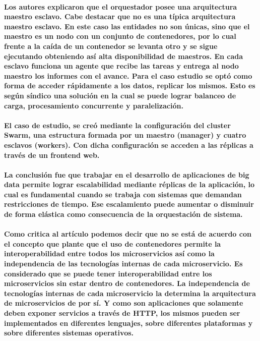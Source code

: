 \paragraph{
    Los autores explicaron que el orquestador posee una arquitectura maestro esclavo. Cabe destacar que no es una típica arquitectura maestro esclavo. En este caso las entidades no son únicas, sino que el maestro es un nodo con un conjunto de contenedores, por lo cual frente a la caída de un contenedor se levanta otro y se sigue ejecutando obteniendo así alta disponibilidad de maestros.
    En cada esclavo funciona un agente que recibe las tareas y entrega al nodo maestro los informes con el avance.
    Para el caso estudio se optó como forma de acceder rápidamente a los datos, replicar los mismos.
    Esto es según síndico una solución en la cual se puede lograr balanceo de carga, procesamiento concurrente y paralelización.
}

\paragraph{
    El caso de estudio, se creó mediante la configuración del cluster Swarm, una estructura formada por un maestro (manager) y cuatro esclavos (workers).
    Con dicha configuración se acceden a las réplicas a través de un frontend web.
}

\paragraph{
    La conclusión fue que trabajar en el desarrollo de aplicaciones de big data permite lograr escalabilidad mediante réplicas de la aplicación, lo cual es fundamental cuando se trabaja con sistemas que demandan restricciones de tiempo.
    Ese escalamiento puede aumentar o disminuir de forma elástica como consecuencia de la orquestación de sistema.
}

\paragraph{
    Como critica al artículo podemos decir que no se está de acuerdo con el concepto que plante que
    el uso de contenedores permite la interoperabilidad entre todos los microservicios así como la independencia de las tecnologías internas de cada microservicio.
    Es considerado que se puede tener interoperabilidad entre los microservicios sin estar dentro de contenedores. La independencia de tecnologías internas de cada microservicio la determina la arquitectura de microservicios de por sí. Y como son aplicaciones que solamente deben exponer servicios a través de HTTP, los mismos pueden ser implementados en diferentes lenguajes, sobre diferentes plataformas y sobre diferentes sistemas operativos.
}